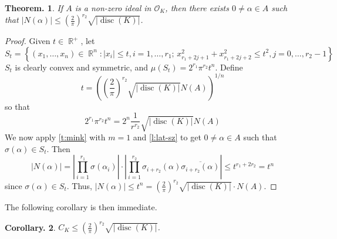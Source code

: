 \documentclass[11pt, a4paper]{memoir}
\DeclareMathOperator{\R}{{\mathbb{R}}}
\newcommand{\ol}[1]{\ensuremath{\overline{#1}}}
\theoremstyle{change}
\newtheorem{theorem}{Theorem.}[section]
\newtheorem{corollary}[theorem]{Corollary.}
\theoremstyle{plain}
\theoremstyle{nonumberplain}
\newtheorem{proof}{Proof}
\DeclareMathOperator{\disc}{disc}
\numberwithin{equation}{section}
\begin{document}
\begin{theorem}
    If $A$ is a non-zero ideal in $\mathcal{O}_K$, then there exists $0\neq\alpha\in A$ such that $|N(\alpha)|\leq\left(\frac{2}{\pi}\right)^{r_2}\sqrt{|\disc(K)|}$.
\end{theorem}
\begin{proof}
    Given $t\in\R^+$, let
    \begin{equation*}
        S_t=\left\{(x_1,\ldots,x_n)\in\R^n:|x_i|\leq t,i=1,\ldots,r_1;\, x_{r_1+2j+1}^2+x_{r_1+2j+2}^2\leq t^2, j=0,\ldots,r_2-1\right\}
    \end{equation*}
    $S_t$ is clearly convex and symmetric, and $\mu(S_t)=2^{r_1}\pi^{r_2}t^n$.
    Define
    \begin{equation*}
        t=\left(\left(\frac{2}{\pi}\right)^{r_2}\sqrt{|\disc(K)|}N(A)\right)^{1/n}
    \end{equation*}
    so that
    \begin{equation*}
        2^{r_1}\pi^{r_2}t^n=2^n\frac{1}{r^{r_2}}\sqrt{|\disc(K)|}N(A)
    \end{equation*}
    We now apply \cref{t:mink} with $m=1$ and \cref{l:lat-sz} to get $0\neq\alpha\in A$ such that $\sigma(\alpha)\in S_t$.
    Then
    \begin{equation*}
        |N(\alpha)|=\left\lvert\prod_{i=1}^{r_1}\sigma(\alpha_i)\right\rvert\cdot\left\lvert\prod_{i=1}^{r_2}\sigma_{i+r_2}(\alpha)\ol{\sigma_{i+r_2}(\alpha)}\right\rvert
        \leq t^{r_1+2r_2}=t^n
    \end{equation*}
    since $\sigma(\alpha)\in S_t$.
    Thus, $|N(\alpha)|\leq t^n=\left(\frac{2}{\pi}\right)^{r_2}\sqrt{|\disc(K)|}\cdot N(A)$.
\end{proof}
The following corollary is then immediate.
\begin{corollary}
    $C_K\leq\left(\frac{2}{\pi}\right)^{r_2}\sqrt{|\disc(K)|}$.
\end{corollary}
\end{document}
